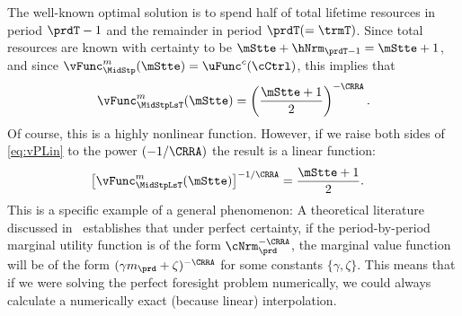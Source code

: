 \documentclass[\econtexRoot/SolvingMicroDSOPs]{subfiles}
\begin{document}
The well-known optimal solution is to spend half of total lifetime resources in period $\prdT-1$ and the remainder in period $\prdT (=\trmT)$.  Since total resources are known with certainty to be $\mStte+\hNrm_{\prdT-1}= \mStte+1$, and since $\vFunc_{\MidStp}^{m}(\mStte) = \uFunc^{c}(\cCtrl)$, this implies that
\begin{equation}
  \vFunc^{m}_{\MidStpLsT}(\mStte)  = \left(\frac{\mStte+1}{2}\right)^{-\CRRA} \label{eq:vPLin}.
\end{equation}
Of course, this is a highly nonlinear function.  However, if we raise both sides of \eqref{eq:vPLin} to the power $(-1/\CRRA)$ the result is a linear function:
\begin{equation}\begin{gathered}\begin{aligned}
      \left[\vFunc^{m}_{\MidStpLsT}(\mStte)\right]^{-1/\CRRA}  & = \frac{\mStte+1}{2}  .
    \end{aligned}\end{gathered}\end{equation}
This is a specific example of a general phenomenon: A theoretical literature discussed in~\cite{ckConcavity} establishes that under perfect certainty, if the period-by-period marginal utility function is of the form $\cNrm_{\prd}^{-\CRRA}$, the marginal value function will be of the form $(\gamma m_{\prd}+\zeta)^{-\CRRA}$ for some constants $\{\gamma,\zeta\}$.  This means that if we were solving the perfect foresight problem numerically, we could always calculate a numerically exact (because linear) interpolation.
\end{document}

